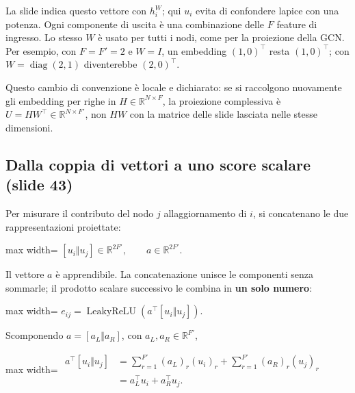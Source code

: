 \documentclass[11pt,a4paper,oneside,openany]{book}
\begin{document}
La slide indica questo vettore con \(h_i^W\); qui \(u_i\) evita di confondere l\textquotesingle apice con una potenza. Ogni componente di uscita è una combinazione delle \(F\) feature di ingresso. Lo stesso \(W\) è usato per tutti i nodi, come per la proiezione della GCN. Per esempio, con \(F=F'=2\) e \(W=I\), un embedding \((1,0)^\top\) resta \((1,0)^\top\); con \(W=\operatorname{diag}(2,1)\) diventerebbe \((2,0)^\top\).

Questo cambio di convenzione è locale e dichiarato: se si raccolgono nuovamente gli embedding per righe in \(H\in\mathbb R^{N\times F}\), la proiezione complessiva è \(U=HW^\top\in\mathbb R^{N\times F'}\), non \(HW\) con la matrice delle slide lasciata nelle stesse dimensioni.

\subsection{Dalla coppia di vettori a uno score scalare (slide 43)}\label{f05-n30-r834}

Per misurare il contributo del nodo \(j\) all\textquotesingle aggiornamento di \(i\), si concatenano le due rappresentazioni proiettate:

\begin{center}
\begin{adjustbox}{max width=\linewidth}
$\displaystyle [u_i\Vert u_j]\in\mathbb R^{2F'},\qquad a\in\mathbb R^{2F'}.$
\end{adjustbox}
\end{center}

Il vettore \(a\) è apprendibile. La concatenazione unisce le componenti senza sommarle; il prodotto scalare successivo le combina in \textbf{un solo numero}:

\begin{center}
\begin{adjustbox}{max width=\linewidth}
$\displaystyle \boxed{e_{ij}=\operatorname{LeakyReLU}\left(a^\top[u_i\Vert u_j]\right).}$
\end{adjustbox}
\end{center}

Scomponendo \(a=[a_L\Vert a_R]\), con \(a_L,a_R\in\mathbb R^{F'}\),

\begin{center}
\begin{adjustbox}{max width=\linewidth}
$\displaystyle \begin{aligned}
a^\top[u_i\Vert u_j]&=\sum_{r=1}^{F'}(a_L)_r(u_i)_r+
\sum_{r=1}^{F'}(a_R)_r(u_j)_r\\
&=a_L^\top u_i+a_R^\top u_j.
\end{aligned}$
\end{adjustbox}
\end{center}
\end{document}
